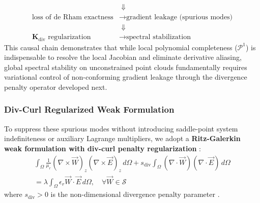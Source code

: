 \documentclass[preprint,12pt]{elsarticle}
\begin{document}
\begin{enumerate}
\begin{equation}
{\begin{aligned}
                                                                       & \;\Downarrow                                                              \\
                      \text{loss of de Rham exactness}                 & \longrightarrow \text{gradient leakage (spurious modes)}                  \\
                                                                       & \;\Downarrow                                                              \\
                      \mathbf{K}_{\mathrm{div}} \text{ regularization} & \longrightarrow \text{spectral stabilization}
                  \end{aligned}
              }
              \label{eq:conceptual_chain}
          \end{equation}
          This causal chain demonstrates that while local polynomial completeness ($\mathcal{P}^1$) is indispensable to resolve the local Jacobian and eliminate derivative aliasing, global spectral stability on unconstrained point clouds fundamentally requires variational control of non-conforming gradient leakage through the divergence penalty operator developed next.
\end{enumerate}

\subsubsection{Div-Curl Regularized Weak Formulation}
\label{subsubsec:div_curl_weak_form}
To suppress these spurious modes without introducing saddle-point system indefiniteness or auxiliary Lagrange multipliers, we adopt a \textbf{Ritz-Galerkin weak formulation with div-curl penalty regularization} \cite{monk2003finite, bossavit1998computational, boffi2013mixed}:
\begin{multline}
    \int_{\Omega} \frac{1}{\mu_r} (\nabla \times \vec{W})_z (\nabla \times \vec{E})_z \, d\Omega + s_{\mathrm{div}} \int_{\Omega} (\nabla \cdot \vec{W}) (\nabla \cdot \vec{E}) \, d\Omega \\
    = \lambda \int_{\Omega} \epsilon_r \vec{W} \cdot \vec{E} \, d\Omega, \quad \forall \vec{W} \in \mathcal{S}
    \label{eq:regularized_weak_form}
\end{multline}
where $s_{\mathrm{div}} > 0$ is the non-dimensional divergence penalty parameter \cite{monk2003finite}.
\end{document}
